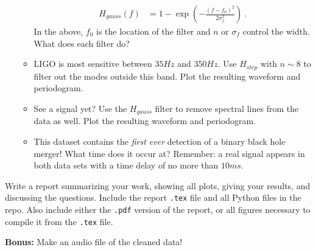 \documentclass{article}
\begin{document}
\begin{enumerate}
\begin{itemize}
\begin{align}
				H_{gauss}(f) &= 1 - \exp\left(-\frac{(f-f_0)^2}{2\sigma_f^2}\right) \ .
			\end{align}
			In the above, $f_0$ is the location of the filter and $n$ or $\sigma_f$ control the width.  What does each filter do?
			\item LIGO is most sensitive between $35Hz$ and $350Hz$. Use $H_{step}$ with $n\sim8$ to filter out the modes outside this band.  Plot the resulting waveform and periodogram.
			\item See a signal yet? Use the $H_{gauss}$ filter to remove spectral lines from the data as well.  Plot the resulting waveform and periodogram.
			\item This dataset contains the \emph{first ever} detection of a binary black hole merger!  What time does it occur at?  Remember: a real signal appears in both data sets with a time delay of no more than $10 ms$.
		\end{itemize}
\end{enumerate}

Write a report summarizing your work, showing all plots, giving your results, and discussing the questions.  Include the report \texttt{.tex} file and all Python files in the repo.  Also include either the \texttt{.pdf} version of the report, or all figures necessary to compile it from the \texttt{.tex} file.


{\bf Bonus:} Make an audio file of the cleaned data!
\end{document}
